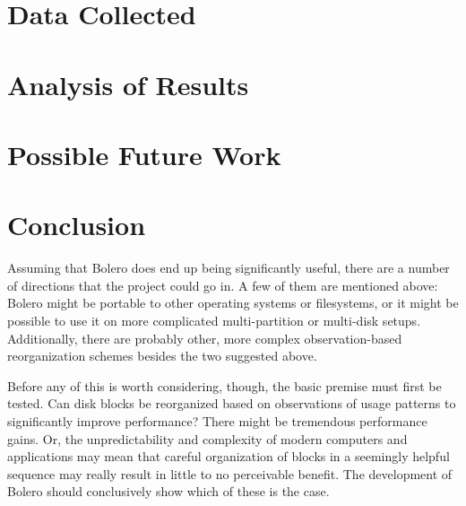 \documentclass[10pt]{article}
\begin{document}
\section{Data Collected}

\section{Analysis of Results}

\section{Possible Future Work}

\section{Conclusion}

Assuming that Bolero does end up being significantly useful, there are a number of directions that
the project could go in. A few of them are mentioned above: Bolero might be portable to other
operating systems or filesystems, or it might be possible to use it on more complicated multi-partition
or multi-disk setups. Additionally, there are probably other, more complex observation-based reorganization schemes
besides the two suggested above.

Before any of this is worth considering, though, the basic premise must first be tested. Can disk
blocks be reorganized based on observations of usage patterns to significantly improve performance?
There might be tremendous performance gains. Or, the unpredictability and complexity of modern
computers and applications may mean that careful organization of blocks in a seemingly helpful
sequence may really result in little to no perceivable benefit. The development of Bolero should conclusively
show which of these is the case.

{}

\end{document}
